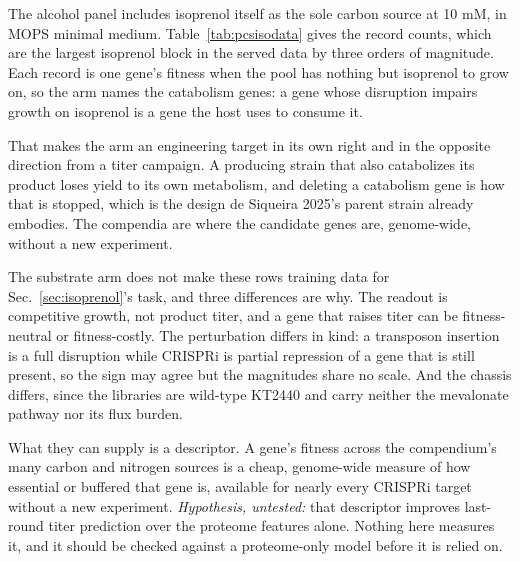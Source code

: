  The alcohol panel
includes isoprenol itself as the sole carbon source at 10 mM, in MOPS minimal medium.
Table~\ref{tab:pcsisodata} gives the record counts, which are the largest isoprenol
block in the served data by three orders of magnitude. Each record is one gene's
fitness when the pool has nothing but isoprenol to grow on, so the arm names the
catabolism genes: a gene whose disruption impairs growth on isoprenol is a gene the
host uses to consume it.

That makes the arm an engineering target in its own right and in the opposite
direction from a titer campaign. A producing strain that also catabolizes its product
loses yield to its own metabolism, and deleting a catabolism gene is how that is
stopped, which is the design de Siqueira 2025's parent strain already embodies. The
compendia are where the candidate genes are, genome-wide, without a new experiment.

 The substrate arm does
not make these rows training data for Sec.~\ref{sec:isoprenol}'s task, and three
differences are why. The readout is competitive growth, not product titer, and a gene
that raises titer can be fitness-neutral or fitness-costly. The perturbation differs in
kind: a transposon insertion is a full disruption while CRISPRi is partial repression
of a gene that is still present, so the sign may agree but the magnitudes share no
scale. And the chassis differs, since the libraries are wild-type KT2440 and carry
neither the mevalonate pathway nor its flux burden.

What they can supply is a descriptor. A gene's fitness across the compendium's many
carbon and nitrogen sources is a cheap, genome-wide measure of how essential or
buffered that gene is, available for nearly every CRISPRi target without a new
experiment. \emph{Hypothesis, untested:} that descriptor improves last-round titer
prediction over the proteome features alone. Nothing here measures it, and it should be
checked against a proteome-only model before it is relied on.

